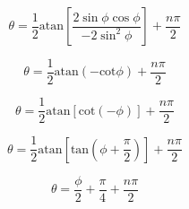 \documentclass{article}
\begin{document}
\begin{equation}
	\theta = \frac{1}{2}\text{atan}\left[\frac{2\sin\phi\cos\phi}{-2\sin^2\phi}\right]+\frac{n\pi}{2}
\end{equation}

\begin{equation}
	\theta = \frac{1}{2}\text{atan}(-\text{cot}\phi)+\frac{n\pi}{2}
\end{equation}

\begin{equation}
	\theta = \frac{1}{2}\text{atan}[\text{cot}(-\phi)]+\frac{n\pi}{2}
\end{equation}

\begin{equation}
	\theta = \frac{1}{2}\text{atan}\left[\text{tan}\left(\phi+\frac{\pi}{2}\right)\right]+\frac{n\pi}{2}
\end{equation}

\begin{equation}
	\theta = \frac{\phi}{2}+\frac{\pi}{4}+\frac{n\pi}{2}
\end{equation}
\end{document}
